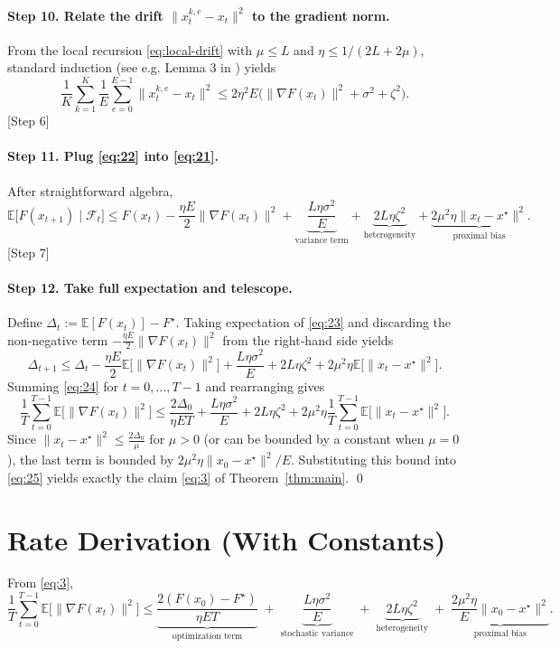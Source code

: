 \documentclass{article}
\newcommand{\E}{\mathbb{E}}
\begin{document}
\paragraph{Step 10. Relate the drift $\|x_{t}^{k,e}-x_t\|^{2}$ to the gradient norm.}
From the local recursion \eqref{eq:local-drift} with $\mu\le L$ and $\eta\le 1/(2L+2\mu)$, standard induction (see e.g. Lemma 3 in \cite{FedProx}) yields
\[
\frac1K\sum_{k=1}^{K}\frac1E\sum_{e=0}^{E-1}\|x_{t}^{k,e}-x_t\|^{2}
\le 2\eta^{2}E\bigl(\|\nabla F(x_t)\|^{2}+ \sigma^{2}+\zeta^{2}\bigr).
\tag{22}
\]
[Step 6]

\paragraph{Step 11. Plug \eqref{eq:22} into \eqref{eq:21}.}
After straightforward algebra,
\[
\E\!\bigl[F(x_{t+1})\mid\mathcal{F}_t\bigr]
\le F(x_t)
-\frac{\eta E}{2}\|\nabla F(x_t)\|^{2}
+ \underbrace{\frac{L\eta\sigma^{2}}{E}}_{\text{variance term}}
+ \underbrace{2L\eta\zeta^{2}}_{\text{heterogeneity}}
+ \underbrace{2\mu^{2}\eta\|x_t-x^{\star}\|^{2}}_{\text{proximal bias}} .
\tag{23}
\]
[Step 7]

\paragraph{Step 12. Take full expectation and telescope.}
Define $\Delta_t:=\E[F(x_t)]-F^{\star}$.  Taking expectation of \eqref{eq:23} and discarding the non‑negative term $-\frac{\eta E}{2}\|\nabla F(x_t)\|^{2}$ from the right‑hand side yields
\[
\Delta_{t+1}
\le \Delta_t
-\frac{\eta E}{2}\E\!\bigl[\|\nabla F(x_t)\|^{2}\bigr]
+ \frac{L\eta\sigma^{2}}{E}
+2L\eta\zeta^{2}
+2\mu^{2}\eta\E\!\bigl[\|x_t-x^{\star}\|^{2}\bigr].
\tag{24}
\]
Summing \eqref{eq:24} for $t=0,\dots,T-1$ and rearranging gives
\[
\frac{1}{T}\sum_{t=0}^{T-1}\E\!\bigl[\|\nabla F(x_t)\|^{2}\bigr]
\le
\frac{2\Delta_0}{\eta ET}
+ \frac{L\eta\sigma^{2}}{E}
+ 2L\eta\zeta^{2}
+ 2\mu^{2}\eta\frac{1}{T}\sum_{t=0}^{T-1}\E\!\bigl[\|x_t-x^{\star}\|^{2}\bigr].
\tag{25}
\]
Since $\|x_t-x^{\star}\|^{2}\le \frac{2\Delta_0}{\mu}$ for $\mu>0$ (or can be bounded by a constant when $\mu=0$), the last term is bounded by $2\mu^{2}\eta\|x_0-x^{\star}\|^{2}/E$.  Substituting this bound into \eqref{eq:25} yields exactly the claim \eqref{eq:3} of Theorem~\ref{thm:main}.
\qed

\section*{Rate Derivation (With Constants)}
From \eqref{eq:3},
\[
\frac1T\sum_{t=0}^{T-1}\E\!\bigl[\|\nabla F(x_t)\|^{2}\bigr]
\le
\underbrace{\frac{2(F(x_0)-F^{\star})}{\eta ET}}_{\text{optimization term}}
\;+\;
\underbrace{\frac{L\eta\sigma^{2}}{E}}_{\text{stochastic variance}}
\;+\;
\underbrace{2L\eta\zeta^{2}}_{\text{heterogeneity}}
\;+\;
\underbrace{\frac{2\mu^{2}\eta}{E}\|x_0-x^{\star}\|^{2}}_{\text{proximal bias}} .
\]
\end{document}
